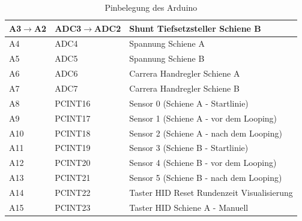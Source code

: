 \documentclass[a4paper, 11pt]{report}
\begin{document}
\begin{table}[hb]
\begin{tabular}{|l|l|l|}
			\hline
			A3$\rightarrow$A2 & ADC3$\rightarrow$ADC2 & Shunt Tiefsetzsteller Schiene B\\
			\hline
			A4 & ADC4 & Spannung Schiene A\\
			\hline
			A5 & ADC5 & Spannung Schiene B\\
			\hline
			A6 & ADC6 & Carrera Handregler Schiene A\\
			\hline
			A7 & ADC7 & Carrera Handregler Schiene B\\
			\hline
			A8 & PCINT16 & Sensor 0 (Schiene A - Startlinie)\\
			\hline
			A9 & PCINT17 & Sensor 1 (Schiene A - vor dem Looping)\\
			\hline
			A10 & PCINT18 & Sensor 2 (Schiene A - nach dem Looping)\\
			\hline
			A11 & PCINT19 & Sensor 3 (Schiene B - Startlinie)\\
			\hline
			A12 & PCINT20 & Sensor 4 (Schiene B - vor dem Looping)\\
			\hline
			A13 & PCINT21 & Sensor 5 (Schiene B - nach dem Looping)\\
			\hline
			A14 & PCINT22 & Taster HID \glqq Reset Rundenzeit Visualisierung\grqq \\
			\hline
			A15 & PCINT23 & Taster HID \glqq Schiene A - Manuell\grqq \\
			\hline
		\end{tabular}
		\caption{Pinbelegung des Arduino}
		\label{tab:AnhangBelegungArduino}
	\end{table}
\end{document}
